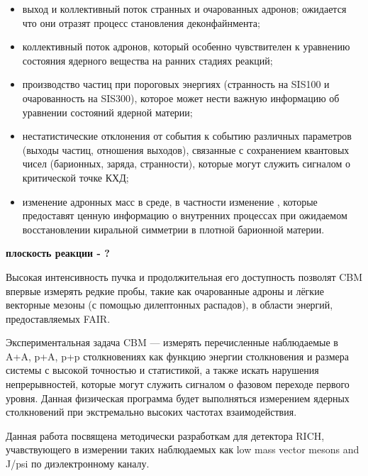 \begin{itemize}
\item выход и коллективный поток странных и очарованных адронов; ожидается что они отразят процесс становления деконфайнмента;
\item коллективный поток адронов, который особенно чувствителен к уравнению состояния ядерного вещества на ранних стадиях реакций;
\item производство частиц при пороговых энергиях (странность на SIS100 и очарованность на SIS300), которое может нести важную информацию об уравнении состояний ядерной материи;
\item нестатистические отклонения от события к событию различных параметров (выходы частиц, отношения выходов), связанные с сохранением квантовых чисел (барионных, заряда, странности), которые могут служить сигналом о критической точке КХД;
\item изменение адронных масс в среде, в частности изменение \todo, которые предоставят ценную информацию о внутренних процессах при ожидаемом восстановлении киральной симметрии в плотной барионной материи.
\end{itemize}

\todo \textbf{плоскость реакции - ?}

Высокая интенсивность пучка и продолжительная его доступность позволят CBM впервые измерять редкие пробы, такие как очарованные адроны и лёгкие векторные мезоны (с помощью дилептонных распадов), в области энергий, предоставляемых FAIR.

Экспериментальная задача CBM --- измерять перечисленные наблюдаемые в A+A, p+A, p+p столкновениях как функцию энергии столкновения и размера системы с высокой точностью и статистикой, а также искать нарушения непрерывностей, которые могут служить сигналом о фазовом переходе первого уровня. Данная физическая программа будет выполняться измерением ядерных столкновений при экстремально высоких частотах взаимодействия.

Данная работа посвящена методически разработкам для детектора RICH, учавствующего в измерении таких наблюдаемых как low mass vector mesons and J/psi по диэлектронному каналу.









